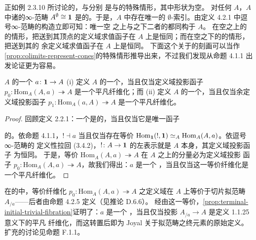 正如例 2.3.10 所讨论的，\trTerminal{}\trElement{}与\trInitial{}\trElement{}分别
是\trLimit{}与\trColimit{}的特殊情形，其中\trDiagram{}形状为空。
对任何\trInfinityCategory{} $A$，$A$ 中诸\trEmptyDiagram{}的∞-范畴
$A^{\emptyset}\cong\mathbf{1}$ 是\trTerminal{}的。于是，$A$ 中存在唯一的
$\emptyset$-索引\trDiagram{}。由定义 4.2.1 中逗号∞-范畴的构造立即可知：唯一空%
\trDiagram{}之上与之下二者的\trInfinityCategoryOfCones{}都同构于 $A$。
在空\trDiagram{}之上的\trCone{}的情形，把\trCone{}送到其顶点的定义域求值函子在
$A$ 上是恒同；而在空\trDiagram{}之下的\trCone{}的情形，把\trCone{}送到其\trNadir{}的
余定义域求值函子在 $A$ 上是恒同。
下面这个关于\trTerminal{}\trElement{}的刻画可以当作%
\cref{prop:colimits-represent-cones}的特殊情形推导出来，不过我们发现从命题 4.1.1
出发论证更为容易。

\begin{proposition}\label{prop:terminal-initial-trivial-fibration}
\trInfinityCategory{} $A$ 的一个\trElement{} $a\colon\mathbf{1}\to A$
(i) 定义 $A$ 的一个\trTerminal{}\trElement{}，当且仅当定义域投影函子
$p_{0}\colon\mathrm{Hom}_{A}(A,a)\twoheadrightarrow A$ 是一个平凡纤维化；而
(ii) 定义 $A$ 的一个\trInitial{}\trElement{}，当且仅当余定义域投影函子
$p_{1}\colon\mathrm{Hom}_{A}(a,A)\twoheadrightarrow A$ 是一个平凡纤维化。
\end{proposition}

\begin{proof}
回顾定义 2.2.1：一个\trElement{}是\trTerminal{}的，当且仅当它是唯一函子
\begin{center}
\end{center}
的\trRightAdjoint{}。依命题 4.1.1，$!\dashv a$ 当且仅当存在等价
$\mathrm{Hom}_{\mathbf{1}}(!,\mathbf{1})\simeq_{A}\mathrm{Hom}_{A}(A,a)$。依逗号∞-范畴的
定义性拉回 (3.4.2)，$!\colon A\to\mathbf{1}$ 的左表示就是 $A$ 本身，其定义域投影函子
为恒同。
于是，等价 $\mathrm{Hom}_{A}(A,a)\twoheadrightarrow A$ 在 $A$ 之上的分量必为定义域投影
函子 $p_{0}\colon\mathrm{Hom}_{A}(A,a)\twoheadrightarrow A$，故我们得出：$a$ 是一个%
\trTerminal{}\trElement{}，当且仅当这一等价纤维化是一个平凡纤维化。
\end{proof}

\begin{digression}\label{dig:terminal-elements-quasi-category}
在\trQuasiCategory{}的\trInfinityCosmos{}中，等价纤维化
$p_{0}\colon\mathrm{Hom}_{A}(A,a)\allowbreak\twoheadrightarrow\allowbreak A$ 之定义域在 $A$ 上等价于切片拟范畴
$A_{/a}$——后者由命题 4.2.5 定义（见推论 D.6.6）。
经由这一等价，\cref{prop:terminal-initial-trivial-fibration}证明了：$a$ 是一个%
\trTerminal{}\trElement{}，当且仅当投影 $A_{/a}\to A$ 是定义 1.1.25 意义下的平凡
纤维化，而这转置后即为 Joyal 关于拟范畴之终元素的原始定义。扩充的讨论见命题
F.1.1。
\end{digression}

